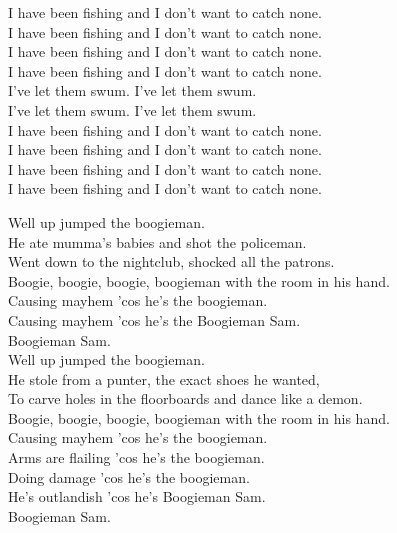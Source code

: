 I have been fishing and I don't want to catch none. \\
I have been fishing and I don't want to catch none. \\
I have been fishing and I don't want to catch none. \\
I have been fishing and I don't want to catch none. \\

I've let them swum. I've let them swum. \\
I've let them swum. I've let them swum. \\

I have been fishing and I don't want to catch none. \\
I have been fishing and I don't want to catch none. \\
I have been fishing and I don't want to catch none. \\
I have been fishing and I don't want to catch none. \\




Well up jumped the boogieman. \\
He ate mumma's babies and shot the policeman. \\
Went down to the nightclub, shocked all the patrons. \\
Boogie, boogie, boogie, boogieman with the room in his hand. \\
Causing mayhem 'cos he's the boogieman. \\
Causing mayhem 'cos he's the Boogieman Sam. \\
Boogieman Sam. \\

Well up jumped the boogieman. \\
He stole from a punter, the exact shoes he wanted, \\
To carve holes in the floorboards and dance like a demon. \\
Boogie, boogie, boogie, boogieman with the room in his hand. \\
Causing mayhem 'cos he's the boogieman. \\
Arms are flailing 'cos he's the boogieman. \\
Doing damage 'cos he's the boogieman. \\
He's outlandish 'cos he's Boogieman Sam. \\
Boogieman Sam. \\

